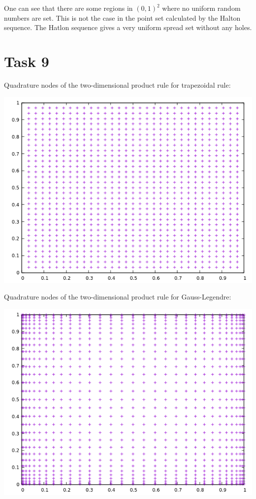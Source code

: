 \documentclass[10pt,a4paper]{article}
\begin{document}
One can see that there are some regions in $(0,1)^2$ where no uniform random numbers are set. This is not the case in the point set calculated by the Halton sequence. The Hatlon sequence gives a very uniform spread set without any holes.

\section*{Task 9}

Quadrature nodes of the two-dimensional product rule for trapezoidal rule:
\begin{center}
\includegraphics[scale=0.5]{quadrature_nodes_trapezoidal_rule.png}		
\end{center}

Quadrature nodes of the two-dimensional product rule for Gauss-Legendre:
\begin{center}
\includegraphics[scale=0.5]{quadrature_nodes_gauss_legendre.png}		
\end{center}
\end{document}
